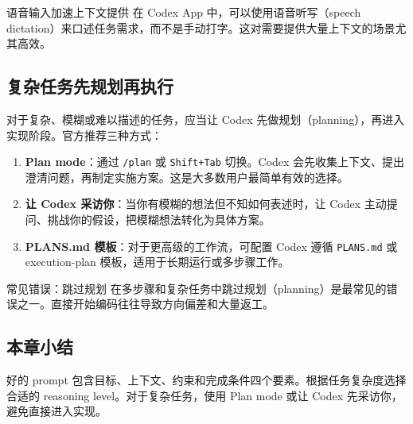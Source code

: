 \begin{knowledgebox}{语音输入加速上下文提供}
在 Codex App 中，可以使用语音听写（speech dictation）来口述任务需求，而不是手动打字。这对需要提供大量上下文的场景尤其高效。
\end{knowledgebox}

\subsection{复杂任务先规划再执行}

对于复杂、模糊或难以描述的任务，应当让 Codex 先做规划（planning），再进入实现阶段。官方推荐三种方式：

\begin{enumerate}
    \item \textbf{Plan mode}：通过 \texttt{/plan} 或 \texttt{Shift+Tab} 切换。Codex 会先收集上下文、提出澄清问题，再制定实施方案。这是大多数用户最简单有效的选择。
    \item \textbf{让 Codex 采访你}：当你有模糊的想法但不知如何表述时，让 Codex 主动提问、挑战你的假设，把模糊想法转化为具体方案。
    \item \textbf{PLANS.md 模板}：对于更高级的工作流，可配置 Codex 遵循 \texttt{PLANS.md} 或 execution-plan 模板，适用于长期运行或多步骤工作。
\end{enumerate}

\begin{warningbox}{常见错误：跳过规划}
在多步骤和复杂任务中跳过规划（planning）是最常见的错误之一。直接开始编码往往导致方向偏差和大量返工。
\end{warningbox}

\subsection{本章小结}

好的 prompt 包含目标、上下文、约束和完成条件四个要素。根据任务复杂度选择合适的 reasoning level。对于复杂任务，使用 Plan mode 或让 Codex 先采访你，避免直接进入实现。

